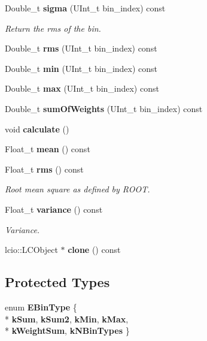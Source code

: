 \begin{DoxyCompactItemize}
\item 
Double\-\_\-t {\bf sigma} (U\-Int\-\_\-t bin\-\_\-index) const 
\begin{DoxyCompactList}\small\item\em Return the rms of the bin. \end{DoxyCompactList}\item 
Double\-\_\-t {\bfseries rms} (U\-Int\-\_\-t bin\-\_\-index) const \label{classhistmgr_1_1Profile1D_a25ee461c0728a5bed40dc6b020b5b220}

\item 
Double\-\_\-t {\bfseries min} (U\-Int\-\_\-t bin\-\_\-index) const \label{classhistmgr_1_1Profile1D_a5d07ca25d79482dd7d8d98178d746784}

\item 
Double\-\_\-t {\bfseries max} (U\-Int\-\_\-t bin\-\_\-index) const \label{classhistmgr_1_1Profile1D_af8406fba0e42d7c9ffcdcf66d5d193c5}

\item 
Double\-\_\-t {\bfseries sum\-Of\-Weights} (U\-Int\-\_\-t bin\-\_\-index) const \label{classhistmgr_1_1Profile1D_ac62849819ee902dffddb7aebc7536691}

\item 
void {\bfseries calculate} ()\label{classhistmgr_1_1Profile1D_ac1fc5c2662bcab8be68b5e3a5b388453}

\item 
Float\-\_\-t {\bfseries mean} () const \label{classhistmgr_1_1Profile1D_af5aa05e5008c1c1bae8f2c4bba9dd904}

\item 
Float\-\_\-t {\bf rms} () const 
\begin{DoxyCompactList}\small\item\em Root mean square as defined by R\-O\-O\-T. \end{DoxyCompactList}\item 
Float\-\_\-t {\bf variance} () const 
\begin{DoxyCompactList}\small\item\em Variance. \end{DoxyCompactList}\item 
lcio\-::\-L\-C\-Object $\ast$ {\bfseries clone} () const \label{classhistmgr_1_1Profile1D_a23277a8a779ce572ed770317146bc7ae}

\end{DoxyCompactItemize}
\subsection*{Protected Types}
\begin{DoxyCompactItemize}
\item 
enum {\bfseries E\-Bin\-Type} \{ \\*
{\bfseries k\-Sum}, 
{\bfseries k\-Sum2}, 
{\bfseries k\-Min}, 
{\bfseries k\-Max}, 
\\*
{\bfseries k\-Weight\-Sum}, 
{\bfseries k\-N\-Bin\-Types}
 \}
\end{DoxyCompactItemize}
